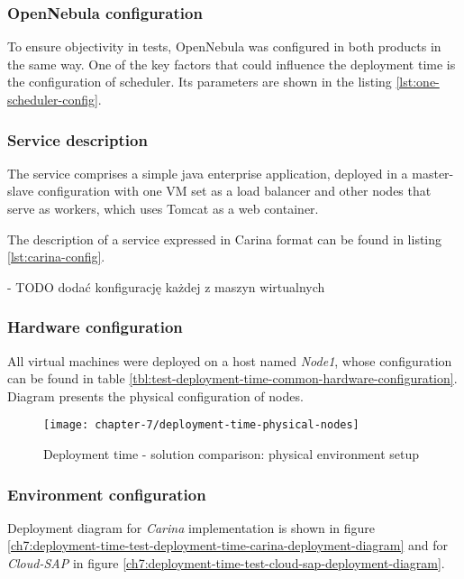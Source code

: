 \subsubsection{OpenNebula configuration}
To ensure objectivity in tests, OpenNebula was configured in both products in the same way. One of the key factors that could influence the deployment time is the configuration of scheduler. Its parameters are shown in the listing \ref{lst:one-scheduler-config}.

\subsubsection{Service description}
The service comprises a simple java enterprise application, deployed in a master-slave configuration with one VM set as a load balancer and other nodes that serve as workers, which uses Tomcat as a web container.

The description of a service expressed in Carina format can be found in listing \ref{lst:carina-config}.

- TODO dodać konfigurację każdej z maszyn wirtualnych 

\subsubsection{Hardware configuration}

All virtual machines were deployed on a host named \emph{Node1}, whose configuration can be found in table \ref{tbl:test-deployment-time-common-hardware-configuration}. Diagram presents the physical configuration of nodes.

\begin{figure}[!ht]
  \begin{center}
    \texttt{[image: chapter-7/deployment-time-physical-nodes]}
  \end{center}
  \caption{Deployment time - solution comparison: physical environment setup}
  \label{eval:deployment-time-physical-nodes}
\end{figure}

\subsubsection{Environment configuration}
Deployment diagram for \emph{Carina} implementation is shown in figure \ref{ch7:deployment-time-test-deployment-time-carina-deployment-diagram} and for \emph{Cloud-SAP} in figure \ref{ch7:deployment-time-test-cloud-sap-deployment-diagram}.

